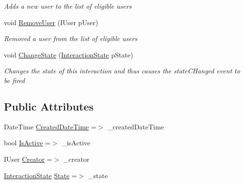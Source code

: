 \begin{DoxyCompactItemize}
\begin{DoxyCompactList}\small\item\em Adds a new user to the list of eligible users \end{DoxyCompactList}\item 
void \hyperlink{class_plex_byte_1_1_mo_cap_1_1_interactions_1_1_survey_ab274203ea62fab8cee7f9f32b29abba7}{Remove\+User} (I\+User p\+User)
\begin{DoxyCompactList}\small\item\em Removed a user from the list of eligible users \end{DoxyCompactList}\item 
void \hyperlink{class_plex_byte_1_1_mo_cap_1_1_interactions_1_1_survey_a7f44759a0d2ea7ce7516559fe8a70a94}{Change\+State} (\hyperlink{namespace_plex_byte_1_1_mo_cap_1_1_interactions_afcb673d9186608b6bd3b187179aedc8a}{Interaction\+State} p\+State)
\begin{DoxyCompactList}\small\item\em Changes the state of this interaction and thus causes the state\+C\+Hanged event to be fired \end{DoxyCompactList}\end{DoxyCompactItemize}
\subsection*{Public Attributes}
\begin{DoxyCompactItemize}
\item 
Date\+Time \hyperlink{class_plex_byte_1_1_mo_cap_1_1_interactions_1_1_survey_a408a891d3aceb61bb7a91e15084a7473}{Created\+Date\+Time} =$>$ \+\_\+created\+Date\+Time
\item 
bool \hyperlink{class_plex_byte_1_1_mo_cap_1_1_interactions_1_1_survey_aea8262119dda55b23d594cbadc4bb1d8}{Is\+Active} =$>$ \+\_\+is\+Active
\item 
I\+User \hyperlink{class_plex_byte_1_1_mo_cap_1_1_interactions_1_1_survey_af2a84b3a5f615138e34cda5b24f30cfd}{Creator} =$>$ \+\_\+creator
\item 
\hyperlink{namespace_plex_byte_1_1_mo_cap_1_1_interactions_afcb673d9186608b6bd3b187179aedc8a}{Interaction\+State} \hyperlink{class_plex_byte_1_1_mo_cap_1_1_interactions_1_1_survey_abd3fc51c6adfad7a540c70512303e280}{State} =$>$ \+\_\+state
\end{DoxyCompactItemize}
